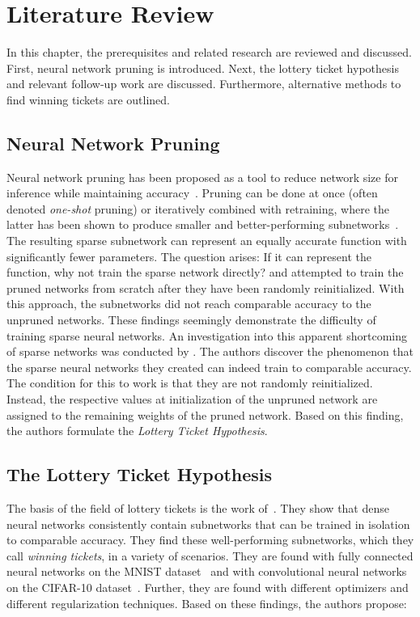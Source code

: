 \chapter{Literature Review}\label{literature_review}
In this chapter, the prerequisites and related research are reviewed and discussed.
First, neural network pruning is introduced. 
Next, the lottery ticket hypothesis and relevant follow-up work are discussed.
Furthermore, alternative methods to find winning tickets are outlined.

\section{Neural Network Pruning}
Neural network pruning has been proposed as a tool to reduce network size for inference while maintaining accuracy~\autocite{OptimalBrainDamage, OptimalBrainSurgeon, HanEtAl15, PruningFiltersForEfficientConvets}.
Pruning can be done at once (often denoted \textit{one-shot} pruning) or iteratively combined with retraining, where the latter has been shown to produce smaller and better-performing subnetworks~\autocite{HanEtAl15}.
The resulting sparse subnetwork can represent an equally accurate function with significantly fewer parameters. 
The question arises: If it can represent the function, why not train the sparse network directly?
\textcite{HanEtAl15} and \textcite{PruningFiltersForEfficientConvets} attempted to train the pruned networks from scratch after they have been randomly reinitialized.
With this approach, the subnetworks did not reach comparable accuracy to the unpruned networks.
These findings seemingly demonstrate the difficulty of training sparse neural networks.
An investigation into this apparent shortcoming of sparse networks was conducted by \textcite{LTH}.
The authors discover the phenomenon that the sparse neural networks they created can indeed train to comparable accuracy.
The condition for this to work is that they are not randomly reinitialized. 
Instead, the respective values at initialization of the unpruned network are assigned to the remaining weights of the pruned network. 
Based on this finding, the authors formulate the \textit{Lottery Ticket Hypothesis}.

\section{The Lottery Ticket Hypothesis}\label{sec:lth}
The basis of the field of lottery tickets is the work of~\cite{LTH}. 
They show that dense neural networks consistently contain subnetworks that can be trained in isolation to comparable accuracy.
They find these well-performing subnetworks, which they call \textit{winning tickets}, in a variety of scenarios.
They are found with fully connected neural networks on the MNIST dataset~\autocite{mnist} and with convolutional neural networks~\autocite{cnn} on the CIFAR-10 dataset~\autocite{cifar}.
Further, they are found with different optimizers and different regularization techniques.
Based on these findings, the authors propose:

